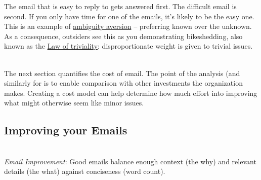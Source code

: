 The email that is easy to reply to gets answered first.  The difficult email is second.
If you only have time for one of the emails, it's likely to be the easy one. This is an example of 
\href{https://en.wikipedia.org/wiki/Ambiguity_aversion}{ambiguity aversion} -- preferring known over the unknown.
\iftoggle{WPinmargin}{\marginpar{$>$Wikipedia: Ambiguity\\aversion}}{}
As a consequence, outsiders see this as you demonstrating bikeshedding, also known as the
\href{https://en.wikipedia.org/wiki/Law_of_triviality}{Law of triviality}: disproportionate weight is given to trivial issues.

\ \\

The next section quantifies the cost of email. The point of the analysis (and similarly for 
\iftoggle{haspagenumbers}{meetings on page~\pageref{sec:financial-models-of-communication})}{meetings)}
is to enable comparison with other investments the organization makes. Creating a cost model can help determine how much effort into improving what might otherwise seem like minor issues.





\subsection*{Improving your Emails\label{sec:email-structure}}




\ \\
\textit{Email Improvement}: Good emails balance enough context (the why) and relevant details (the what) against conciseness (word count). 

